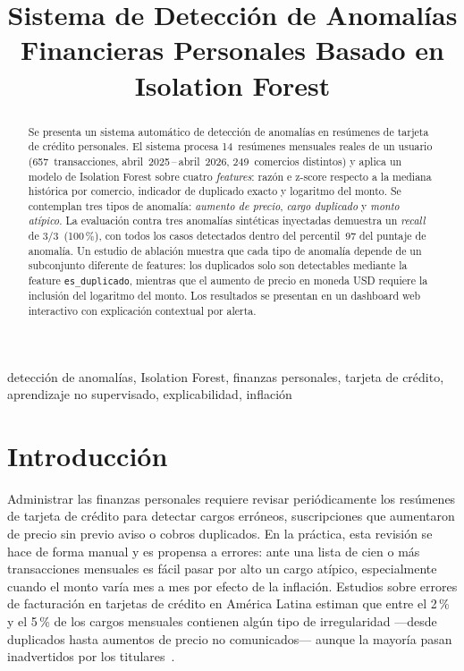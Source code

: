 \documentclass[conference]{IEEEtran}
\title{Sistema de Detecci\'on de Anomal\'ias Financieras Personales
       Basado en Isolation Forest}
\author{
  \IEEEauthorblockN{Juan Guzman}
  \IEEEauthorblockA{
    Universidad de Palermo\\
    Trabajo Final de Grado\\
    Buenos Aires, Argentina\\
    jguzman007195@gmail.com
  }
}
\begin{document}
\maketitle

\begin{abstract}
Se presenta un sistema autom\'atico de detecci\'on de anomal\'ias en res\'umenes de
tarjeta de cr\'edito personales. El sistema procesa 14~res\'umenes mensuales reales
de un usuario (657~transacciones, abril~2025\,--\,abril~2026, 249~comercios distintos)
y aplica un modelo de Isolation Forest sobre cuatro \emph{features}: raz\'on e
z-score respecto a la mediana hist\'orica por comercio, indicador de duplicado exacto
y logaritmo del monto. Se contemplan tres tipos de anomal\'ia: \emph{aumento de
precio}, \emph{cargo duplicado} y \emph{monto at\'ipico}. La evaluaci\'on contra tres
anomal\'ias sint\'eticas inyectadas demuestra un \emph{recall} de 3/3~(100\,\%), con
todos los casos detectados dentro del percentil~97 del puntaje de anomal\'ia. Un
estudio de ablaci\'on muestra que cada tipo de anomal\'ia depende de un subconjunto
diferente de features: los duplicados solo son detectables mediante la feature
\texttt{es\_duplicado}, mientras que el aumento de precio en moneda USD requiere la
inclusi\'on del logaritmo del monto. Los resultados se presentan en un dashboard web
interactivo con explicaci\'on contextual por alerta.
\end{abstract}

\begin{IEEEkeywords}
detecci\'on de anomal\'ias, Isolation Forest, finanzas personales, tarjeta de
cr\'edito, aprendizaje no supervisado, explicabilidad, inflaci\'on
\end{IEEEkeywords}

\section{Introducci\'on}

Administrar las finanzas personales requiere revisar peri\'odicamente los res\'umenes
de tarjeta de cr\'edito para detectar cargos err\'oneos, suscripciones que aumentaron
de precio sin previo aviso o cobros duplicados. En la pr\'actica, esta revisi\'on se
hace de forma manual y es propensa a errores: ante una lista de cien o m\'as
transacciones mensuales es f\'acil pasar por alto un cargo at\'ipico, especialmente
cuando el monto var\'ia mes a mes por efecto de la inflaci\'on. Estudios sobre
errores de facturaci\'on en tarjetas de cr\'edito en Am\'erica Latina estiman que
entre el 2\,\% y el 5\,\% de los cargos mensuales contienen alg\'un tipo de
irregularidad ---desde duplicados hasta aumentos de precio no comunicados--- aunque
la mayor\'ia pasan inadvertidos por los titulares~\cite{ahmed2016survey}.
\end{document}
